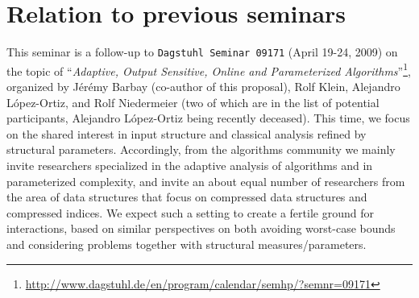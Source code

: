 \documentclass[a4paper,10pt]{article}
\newcommand{\NP}{\ensuremath{\mathsf{NP}}\xspace}
\begin{document}
% 


\section{Relation to previous seminars}

This seminar is a follow-up to \texttt{Dagstuhl Seminar 09171} (April 19-24, 2009) on the topic of ``\emph{Adaptive, Output Sensitive, Online and Parameterized Algorithms}''\footnote{\url{http://www.dagstuhl.de/en/program/calendar/semhp/?semnr=09171}}, organized by J{\'e}r{\'e}my Barbay (co-author of this proposal), Rolf Klein, Alejandro L\'opez-Ortiz, and Rolf Niedermeier (two of which are in the list of potential participants, Alejandro L\'opez-Ortiz being recently deceased). This time, we focus on the shared interest in input structure and classical analysis refined by structural parameters. Accordingly, from the algorithms community we mainly invite researchers specialized in the adaptive analysis of algorithms and in parameterized complexity, and invite an about equal number of researchers from the area of data structures that focus on compressed data structures and compressed indices. We expect such a setting to create a fertile ground for interactions, based on similar perspectives on both avoiding worst-case bounds and considering problems together with structural measures/parameters.
\end{document}

